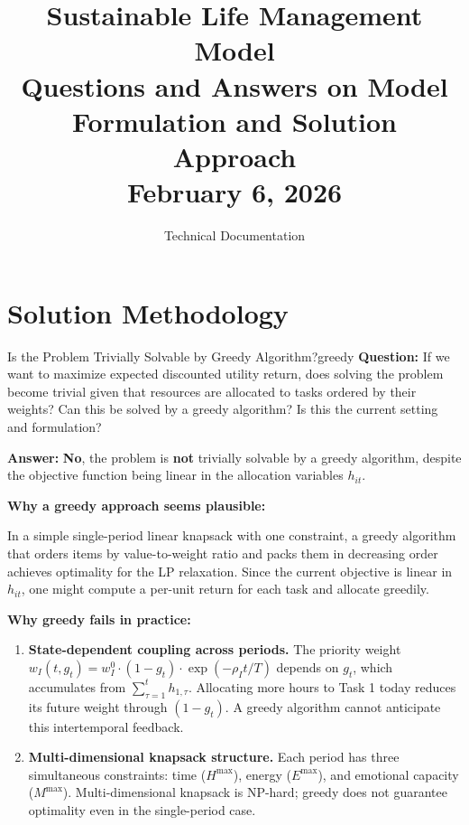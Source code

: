 \documentclass[11pt,a4paper]{article}
\title{\textbf{Sustainable Life Management Model}\\
\large Questions and Answers on Model Formulation and Solution Approach\\
\large February 6, 2026}
\author{Technical Documentation}
\date{}
\begin{document}
\maketitle
\tableofcontents
\newpage

\section{Solution Methodology}

\begin{questionbox}{Is the Problem Trivially Solvable by Greedy Algorithm?}{greedy}
\textbf{Question:} If we want to maximize expected discounted utility return, does solving the problem become trivial given that resources are allocated to tasks ordered by their weights? Can this be solved by a greedy algorithm? Is this the current setting and formulation?

\textbf{Answer:} \textbf{No}, the problem is \textbf{not} trivially solvable by a greedy algorithm, despite the objective function being linear in the allocation variables $h_{it}$.

\textbf{Why a greedy approach seems plausible:}

In a simple single-period linear knapsack with one constraint, a greedy algorithm that orders items by value-to-weight ratio and packs them in decreasing order achieves optimality for the LP relaxation. Since the current objective is linear in $h_{it}$, one might compute a per-unit return for each task and allocate greedily.

\textbf{Why greedy fails in practice:}

\begin{enumerate}
    \item \textbf{State-dependent coupling across periods.} The priority weight $w_I(t, g_t) = w_I^0 \cdot (1 - g_t) \cdot \exp(-\rho_I t/T)$ depends on $g_t$, which accumulates from $\sum_{\tau=1}^{t} h_{1,\tau}$. Allocating more hours to Task 1 today reduces its future weight through $(1 - g_t)$. A greedy algorithm cannot anticipate this intertemporal feedback.
    
    \item \textbf{Multi-dimensional knapsack structure.} Each period has three simultaneous constraints: time ($H^{\max}$), energy ($E^{\max}$), and emotional capacity ($M^{\max}$). Multi-dimensional knapsack is NP-hard; greedy does not guarantee optimality even in the single-period case.
    

\end{enumerate}
\end{questionbox}
\end{document}
